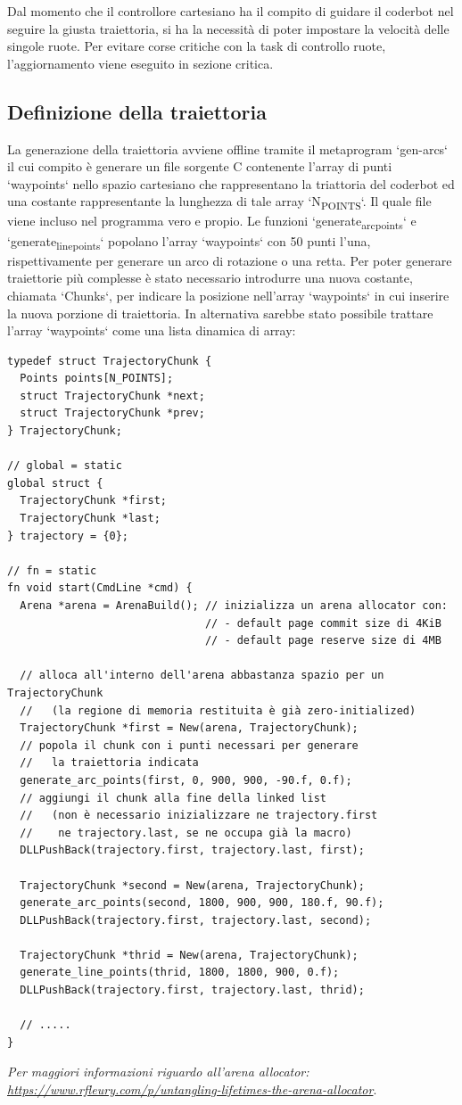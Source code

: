 \documentclass[11pt]{article}
\begin{document}
Dal momento che il controllore cartesiano ha il compito di guidare il coderbot nel seguire la giusta traiettoria, si ha la necessità di poter impostare la velocità delle singole ruote. Per evitare corse critiche con la task di controllo ruote, l'aggiornamento viene eseguito in sezione critica.
\subsection{Definizione della traiettoria}
\label{sec:org9f8ee40}
La generazione della traiettoria avviene offline tramite il metaprogram `gen-arcs` il cui compito è generare un file sorgente C contenente l'array di punti `waypoints` nello spazio cartesiano che rappresentano la triattoria del coderbot ed una costante rappresentante la lunghezza di tale array `N\textsubscript{POINTS}`. Il quale file viene incluso nel programma vero e propio.
Le funzioni `generate\textsubscript{arc}\textsubscript{points}` e `generate\textsubscript{line}\textsubscript{points}` popolano l'array `waypoints` con 50 punti l'una, rispettivamente per generare un arco di rotazione o una retta. Per poter generare traiettorie più complesse è stato necessario introdurre una nuova costante, chiamata `Chunks`, per indicare la posizione nell'array `waypoints` in cui inserire la nuova porzione di traiettoria. In alternativa sarebbe stato possibile trattare l'array `waypoints` come una lista dinamica di array:
\begin{verbatim}
typedef struct TrajectoryChunk {
  Points points[N_POINTS];
  struct TrajectoryChunk *next;
  struct TrajectoryChunk *prev;
} TrajectoryChunk;

// global = static
global struct {
  TrajectoryChunk *first;
  TrajectoryChunk *last;
} trajectory = {0};

// fn = static
fn void start(CmdLine *cmd) {
  Arena *arena = ArenaBuild(); // inizializza un arena allocator con:
                               // - default page commit size di 4KiB
                               // - default page reserve size di 4MB

  // alloca all'interno dell'arena abbastanza spazio per un TrajectoryChunk
  //   (la regione di memoria restituita è già zero-initialized)
  TrajectoryChunk *first = New(arena, TrajectoryChunk);
  // popola il chunk con i punti necessari per generare
  //   la traiettoria indicata
  generate_arc_points(first, 0, 900, 900, -90.f, 0.f);
  // aggiungi il chunk alla fine della linked list
  //   (non è necessario inizializzare ne trajectory.first
  //    ne trajectory.last, se ne occupa già la macro)
  DLLPushBack(trajectory.first, trajectory.last, first);

  TrajectoryChunk *second = New(arena, TrajectoryChunk);
  generate_arc_points(second, 1800, 900, 900, 180.f, 90.f);
  DLLPushBack(trajectory.first, trajectory.last, second);

  TrajectoryChunk *thrid = New(arena, TrajectoryChunk);
  generate_line_points(thrid, 1800, 1800, 900, 0.f);
  DLLPushBack(trajectory.first, trajectory.last, thrid);

  // .....
}
\end{verbatim}
\emph{Per maggiori informazioni riguardo all'arena allocator: \url{https://www.rfleury.com/p/untangling-lifetimes-the-arena-allocator}}.
\end{document}
